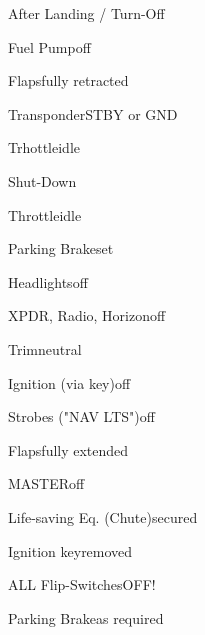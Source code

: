 \begin{checklist}{After Landing / Turn-Off}
	\item{Fuel Pump}{off}
	\item{Flaps}{fully retracted}
	\item{Transponder}{STBY or GND}
	\item{Trhottle}{idle}
\end{checklist}

\begin{checklist}{Shut-Down}
	  \item{Throttle}{idle}
	  \item{Parking Brake}{set}
	  \item{Headlights}{off}
	  \item{XPDR, Radio, Horizon}{off}
	  \item{Trim}{neutral}
	  \item{Ignition (via key)}{off}
	  
	  \item{Strobes ("NAV LTS")}{off}
	  \item{Flaps}{fully extended}
	  \item{MASTER}{off}
	  \item{Life-saving Eq. (Chute)}{secured}
	  \item{Ignition key}{removed}
	  
	  \item{ALL Flip-Switches}{OFF!}
	  \item{Parking Brake}{as required}
\end{checklist}


